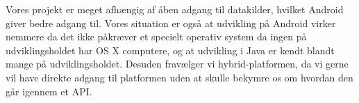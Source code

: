 Vores projekt er meget afhængig af åben adgang til datakilder, hvilket Android giver bedre adgang til.
Vores situation er også at udvikling på Android virker nemmere da det ikke påkræver et specielt operativ system da ingen på udviklingsholdet har OS X computere, og at udvikling i Java er kendt blandt mange på udviklingsholdet.
Desuden fravælger vi hybrid-platformen, da vi gerne vil have direkte adgang til platformen uden at skulle bekymre os om hvordan den går igennem et API.
